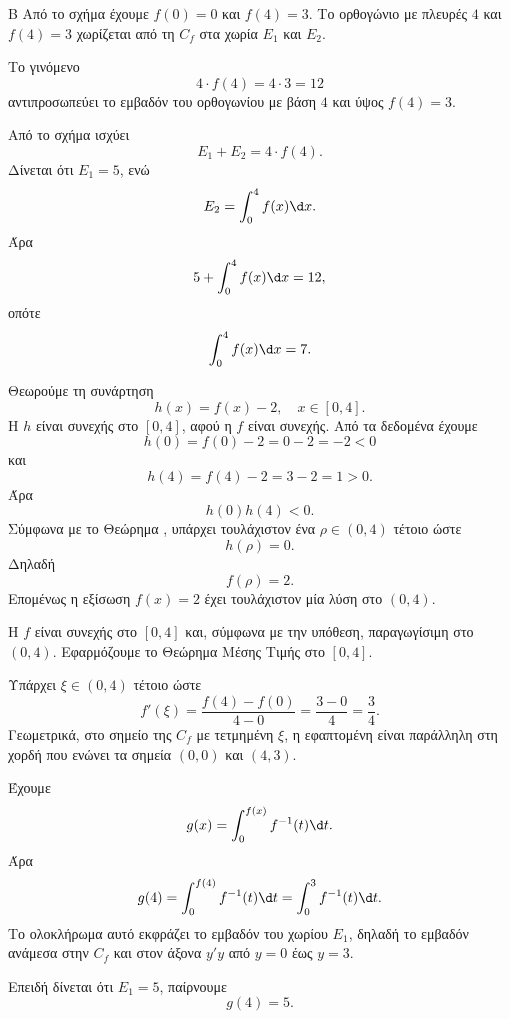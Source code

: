 

\begin{thema}{Β}
Από το σχήμα έχουμε $f(0)=0$ και $f(4)=3$. Το ορθογώνιο με πλευρές $4$ και $f(4)=3$ χωρίζεται από τη $C_f$ στα χωρία $E_1$ και $E_2$.

\begin{erwthma}
\item Το γινόμενο
\[
4\cdot f(4)=4\cdot 3=12
\]
αντιπροσωπεύει το εμβαδόν του ορθογωνίου με βάση $4$ και ύψος $f(4)=3$.

Από το σχήμα ισχύει
\[
E_1+E_2=4\cdot f(4).
\]
Δίνεται ότι $E_1=5$, ενώ
\[
E_2=\dint_0^4 f(x)\d x.
\]
Άρα
\[
5+\dint_0^4 f(x)\d x=12,
\]
οπότε
\[
\dint_0^4 f(x)\d x=7.
\]

\item Θεωρούμε τη συνάρτηση
\[
h(x)=f(x)-2,\quad x\in[0,4].
\]
Η $h$ είναι συνεχής στο $[0,4]$, αφού η $f$ είναι συνεχής. Από τα δεδομένα έχουμε
\[
h(0)=f(0)-2=0-2=-2<0
\]
και
\[
h(4)=f(4)-2=3-2=1>0.
\]
Άρα
\[
h(0)h(4)<0.
\]
Σύμφωνα με το Θεώρημα , υπάρχει τουλάχιστον ένα $\rho\in(0,4)$ τέτοιο ώστε
\[
h(\rho)=0.
\]
Δηλαδή
\[
f(\rho)=2.
\]
Επομένως η εξίσωση $f(x)=2$ έχει τουλάχιστον μία λύση στο $(0,4)$.

\item Η $f$ είναι συνεχής στο $[0,4]$ και, σύμφωνα με την υπόθεση, παραγωγίσιμη στο $(0,4)$. Εφαρμόζουμε το Θεώρημα Μέσης Τιμής στο $[0,4]$.

Υπάρχει $\xi\in(0,4)$ τέτοιο ώστε
\[
f'(\xi)=\frac{f(4)-f(0)}{4-0}
=\frac{3-0}{4}
=\frac{3}{4}.
\]
Γεωμετρικά, στο σημείο της $C_f$ με τετμημένη $\xi$, η εφαπτομένη είναι παράλληλη στη χορδή που ενώνει τα σημεία $(0,0)$ και $(4,3)$.

\item Έχουμε
\[
g(x)=\dint_0^{f(x)} f^{-1}(t)\d t.
\]
Άρα
\[
g(4)=\dint_0^{f(4)} f^{-1}(t)\d t
=\dint_0^3 f^{-1}(t)\d t.
\]
Το ολοκλήρωμα αυτό εκφράζει το εμβαδόν του χωρίου $E_1$, δηλαδή το εμβαδόν ανάμεσα στην $C_f$ και στον άξονα $y'y$ από $y=0$ έως $y=3$.

Επειδή δίνεται ότι $E_1=5$, παίρνουμε
\[
g(4)=5.
\]
\end{erwthma}
\end{thema}



